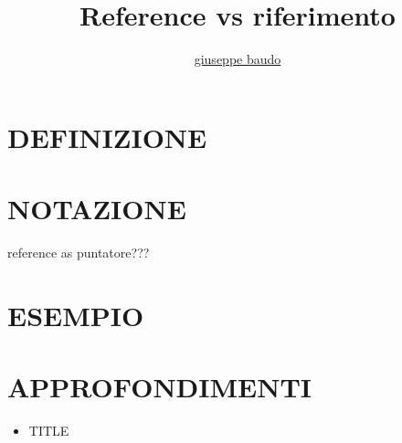 \documentclass[a4paper,10pt]{article}
\title{Reference vs riferimento}
\author{\href{http://www.baudo.hol.es}{giuseppe baudo}}
\begin{document}
\maketitle

\section{DEFINIZIONE}


\section{NOTAZIONE}
reference as puntatore???

\section{ESEMPIO}

\section{APPROFONDIMENTI}
\begin{itemize}
 \item TITLE
\end{itemize}
\end{document}
